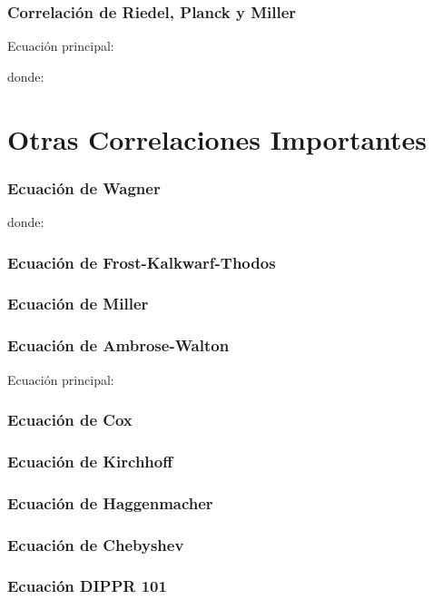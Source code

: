     \subsubsection{Correlación de Riedel, Planck y Miller}

    Ecuación principal:
    \eqRiedel


    donde:
    \eqRiedelAlpha


    \eqRiedelPsi


    \section{Otras Correlaciones Importantes}

    \subsubsection{Ecuación de Wagner}
    \eqWagner


    donde:
    \eqWagnerTau


    \subsubsection{Ecuación de Frost-Kalkwarf-Thodos}
    \eqFrostKalkwarf


    \subsubsection{Ecuación de Miller}
    \eqMiller


    \subsubsection{Ecuación de Ambrose-Walton}

    Ecuación principal:
    \eqAmbroseWalton

    \eqAmbroseWaltonFZero

    \eqAmbroseWaltonFOne

    \eqAmbroseWaltonTau


    \subsubsection{Ecuación de Cox}
    \eqCox


    \subsubsection{Ecuación de Kirchhoff}
    \eqKirchhoff


    \subsubsection{Ecuación de Haggenmacher}
    \eqHaggenmacher


    \subsubsection{Ecuación de Chebyshev}
    \eqChebyshev


    \subsubsection{Ecuación DIPPR 101}
    \eqDIPPR


